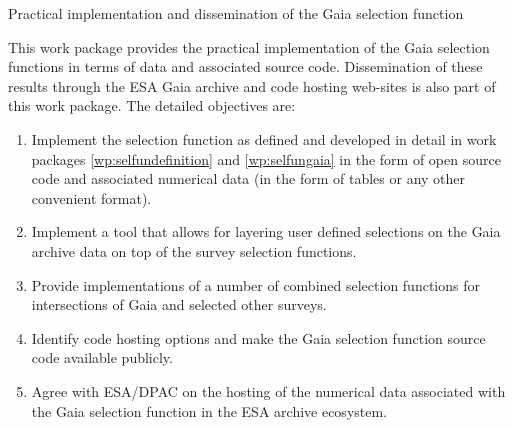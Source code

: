 \begin{workpackage}{Practical implementation and dissemination of the Gaia selection function}
  \label{wp:selfunimplementation}
  \wpend{\duration} %
 
  \makewptable %

  \begin{wpobjectives}
    This work package provides the practical implementation of the Gaia selection functions in terms of data and associated source code. Dissemination of these results through the ESA Gaia archive and code hosting web-sites is also part of this work package. The detailed objectives are:
    \begin{enumerate}
      \item Implement the selection function as defined and developed in detail in work packages \ref{wp:selfundefinition} and \ref{wp:selfungaia} in the form of open source code and associated numerical data (in the form of tables or any other convenient format).
      \item Implement a tool that allows for layering user defined selections on the Gaia archive data on top of the survey selection functions.
      \item Provide implementations of a number of combined selection functions for intersections of Gaia and selected other surveys.
      \item Identify code hosting options and make the Gaia selection function source code available publicly.
      \item Agree with ESA/DPAC on the hosting of the numerical data associated with the Gaia selection function in the ESA archive ecosystem.
    \end{enumerate}
  \end{wpobjectives}


\end{workpackage}
